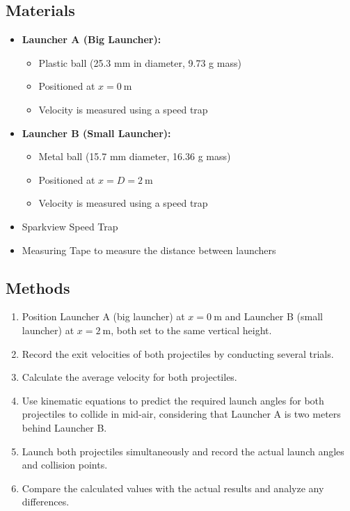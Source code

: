 \documentclass[12pt]{article}
\begin{document}
\subsection{Materials}
\begin{itemize}
    \item \textbf{Launcher A (Big Launcher):}
    \begin{itemize}
        \item Plastic ball (25.3 mm in diameter, 9.73 g mass)
        \item Positioned at $x = 0 \ \text{m}$
        \item Velocity is measured using a speed trap
    \end{itemize}
    \item \textbf{Launcher B (Small Launcher):}
    \begin{itemize}
        \item Metal ball (15.7 mm diameter, 16.36 g mass)
        \item Positioned at $x = D = 2 \ \text{m}$
        \item Velocity is measured using a speed trap
    \end{itemize}
    \item Sparkview Speed Trap
    \item Measuring Tape to measure the distance between launchers
\end{itemize}

\subsection{Methods}
\begin{enumerate}
    \item Position Launcher A (big launcher) at $x = 0 \ \text{m}$ and Launcher B (small launcher) at $x = 2 \ \text{m}$, both set to the same vertical height.
    \item Record the exit velocities of both projectiles by conducting several trials.
    \item Calculate the average velocity for both projectiles.
    \item Use kinematic equations to predict the required launch angles for both projectiles to collide in mid-air, considering that Launcher A is two meters behind Launcher B.
    \item Launch both projectiles simultaneously and record the actual launch angles and collision points.
    \item Compare the calculated values with the actual results and analyze any differences.
\end{enumerate}
\end{document}

